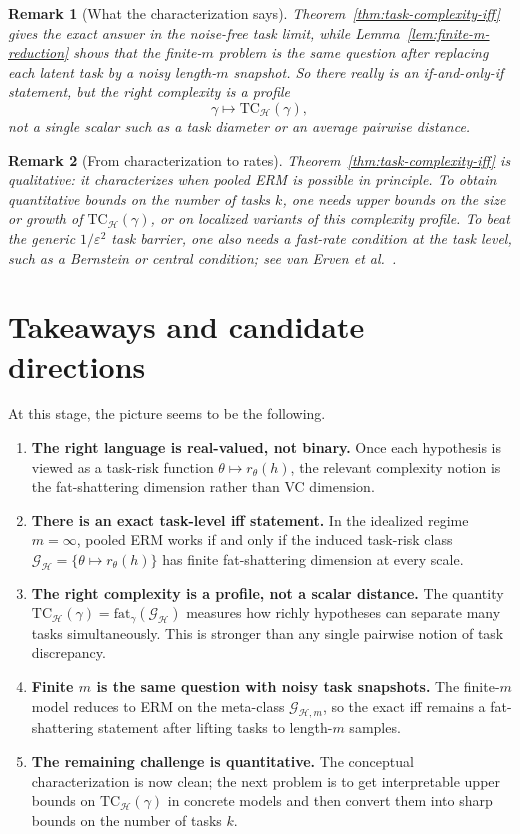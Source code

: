 \documentclass[11pt]{article}
\newtheorem{remark}{Remark}
\theoremstyle{definition}
\begin{document}
\begin{remark}[What the characterization says]
Theorem~\ref{thm:task-complexity-iff} gives the exact answer in the noise-free task limit, while Lemma~\ref{lem:finite-m-reduction} shows that the finite-$m$ problem is the same question after replacing each latent task by a noisy length-$m$ snapshot. So there really is an if-and-only-if statement, but the right complexity is a \emph{profile}
\[
\gamma \mapsto \mathrm{TC}_{\mathcal{H}}(\gamma),
\]
not a single scalar such as a task diameter or an average pairwise distance.
\end{remark}

\begin{remark}[From characterization to rates]
Theorem~\ref{thm:task-complexity-iff} is qualitative: it characterizes when pooled ERM is possible in principle. To obtain quantitative bounds on the number of tasks $k$, one needs upper bounds on the size or growth of $\mathrm{TC}_{\mathcal{H}}(\gamma)$, or on localized variants of this complexity profile. To beat the generic $1/\varepsilon^2$ task barrier, one also needs a fast-rate condition at the task level, such as a Bernstein or central condition; see van Erven et al.~\cite{vanerven2015}.
\end{remark}

\section{Takeaways and candidate directions}
At this stage, the picture seems to be the following.

\begin{enumerate}[label=(\arabic*)]
\item \textbf{The right language is real-valued, not binary.} Once each hypothesis is viewed as a task-risk function $\theta \mapsto r_{\theta}(h)$, the relevant complexity notion is the fat-shattering dimension rather than VC dimension.
\item \textbf{There is an exact task-level iff statement.} In the idealized regime $m=\infty$, pooled ERM works if and only if the induced task-risk class $\mathcal{G}_{\mathcal{H}} = \{\theta \mapsto r_{\theta}(h)\}$ has finite fat-shattering dimension at every scale.
\item \textbf{The right complexity is a profile, not a scalar distance.} The quantity $\mathrm{TC}_{\mathcal{H}}(\gamma) = \mathrm{fat}_{\gamma}(\mathcal{G}_{\mathcal{H}})$ measures how richly hypotheses can separate many tasks simultaneously. This is stronger than any single pairwise notion of task discrepancy.
\item \textbf{Finite $m$ is the same question with noisy task snapshots.} The finite-$m$ model reduces to ERM on the meta-class $\mathcal{G}_{\mathcal{H},m}$, so the exact iff remains a fat-shattering statement after lifting tasks to length-$m$ samples.
\item \textbf{The remaining challenge is quantitative.} The conceptual characterization is now clean; the next problem is to get interpretable upper bounds on $\mathrm{TC}_{\mathcal{H}}(\gamma)$ in concrete models and then convert them into sharp bounds on the number of tasks $k$.
\end{enumerate}
\end{document}
